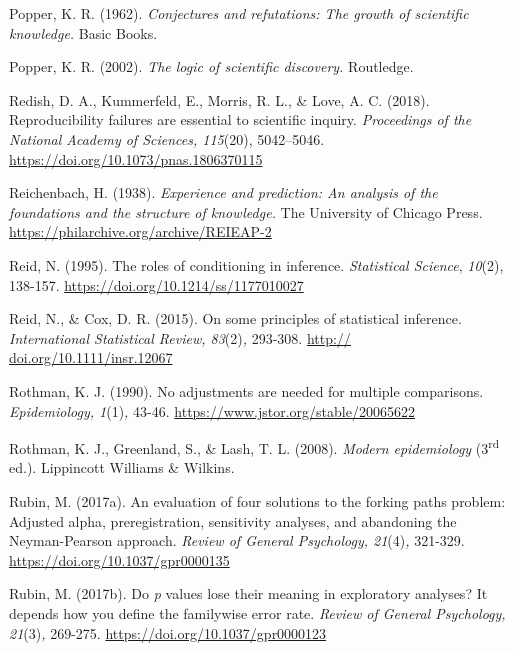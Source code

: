 \documentclass[authordate, meta]{jote-new-article}
\begin{document}
	Popper, K. R. (1962). \emph{Conjectures and refutations: The growth of scientific knowledge.} Basic Books.



	Popper, K. R. (2002). \emph{The logic of scientific discovery.} Routledge.



	Redish, D. A., Kummerfeld, E., Morris, R. L., \& Love, A. C. (2018). Reproducibility failures are essential to scientific inquiry. \emph{Proceedings of the National Academy of Sciences, 115}(20), 5042--5046. \url{https://doi.org/10.1073/pnas.1806370115}



	Reichenbach, H. (1938). \emph{Experience and prediction: An analysis of the foundations and the structure of knowledge.} The University of Chicago Press. \url{https://philarchive.org/archive/REIEAP-2}



	Reid, N. (1995). The roles of conditioning in inference. \emph{Statistical Science}, \emph{10}(2), 138-157. \url{https://doi.org/10.1214/ss/1177010027}



	Reid, N., \& Cox, D. R. (2015). On some principles of statistical inference. \emph{International Statistical Review, 83}(2)\emph{,} 293-308. \url{http:// doi.org/10.1111/insr.12067}



	Rothman, K. J. (1990). No adjustments are needed for multiple comparisons. \emph{Epidemiology, 1}(1)\emph{,} 43-46. \url{https://www.jstor.org/stable/20065622}



	Rothman, K. J., Greenland, S., \& Lash, T. L. (2008). \emph{Modern epidemiology} (3\textsuperscript{rd} ed.). Lippincott Williams \& Wilkins.



	Rubin, M. (2017a). An evaluation of four solutions to the forking paths problem: Adjusted alpha, preregistration, sensitivity analyses, and abandoning the Neyman-Pearson approach. \emph{Review of General Psychology, 21}(4)\emph{,} 321-329. \url{https://doi.org/10.1037/gpr0000135}



	Rubin, M. (2017b). Do \emph{p} values lose their meaning in exploratory analyses? It depends how you define the familywise error rate. \emph{Review of General Psychology, 21}(3)\emph{,} 269-275. \url{https://doi.org/10.1037/gpr0000123}
\end{document}
